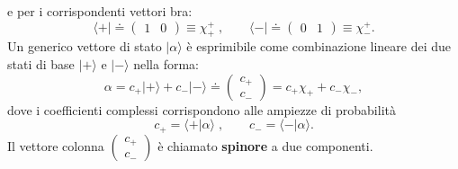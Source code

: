 \documentclass[a4paper,12pt,oneside]{book}
\begin{document}
e per i corrispondenti vettori bra:
\begin{equation}
\langle + \vert \doteq \begin{pmatrix}
1 & 0
\end{pmatrix} \equiv \chi_{+}^{+} \; , \qquad \langle - \vert \doteq \begin{pmatrix}
0 & 1
\end{pmatrix} \equiv \chi_{-}^{+} .
\end{equation}
Un generico vettore di stato $\vert \alpha \rangle$ è esprimibile come combinazione lineare dei due stati di base $\vert + \rangle$ e $\vert - \rangle$ nella forma:
\begin{equation}
\alpha = c_{+}\vert + \rangle + c_{-}\vert - \rangle\doteq \begin{pmatrix}
c_{+}\\
c_{-}
\end{pmatrix}= c_{+}\chi_{+}+c_{-}\chi_{-} ,
\end{equation}
dove i coefficienti complessi corrispondono alle ampiezze di probabilità
\[
c_{+}=\langle + \vert \alpha \rangle \; , \qquad c_{-}=\langle - \vert \alpha \rangle .
\]
Il vettore colonna $\begin{pmatrix}
c_{+}\\
c_{-}
\end{pmatrix}$ è chiamato \textbf{spinore} a due componenti.
\end{document}
